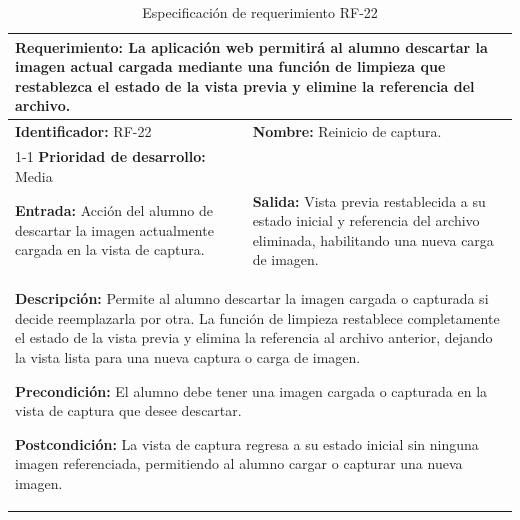 \begin{table}[H]
\caption{Especificación de requerimiento RF-22}
\centering
\renewcommand{\arraystretch}{1.3}
\setlength{\tabcolsep}{6pt}
\begin{tabular}{|p{7cm}|p{8cm}|}
\hline
\multicolumn{2}{|p{15cm}|}{\textbf{Requerimiento:} La aplicación web permitirá al alumno descartar la imagen actual cargada mediante una función de limpieza que restablezca el estado de la vista previa y elimine la referencia del archivo.} \\ \hline
\textbf{Identificador:} RF-22 &
\textbf{Nombre:} Reinicio de captura. \\ \cline{1-1}
\textbf{Prioridad de desarrollo:} Media &
\multicolumn{1}{p{8cm}|}{} \\ \hline
\textbf{Entrada:} Acción del alumno de descartar la imagen actualmente cargada en la vista de captura. &
\textbf{Salida:} Vista previa restablecida a su estado inicial y referencia del archivo eliminada, habilitando una nueva carga de imagen. \\ \hline
\multicolumn{2}{|p{15cm}|}{
\textbf{Descripción:} Permite al alumno descartar la imagen cargada o capturada si decide reemplazarla por otra. La función de limpieza restablece completamente el estado de la vista previa y elimina la referencia al archivo anterior, dejando la vista lista para una nueva captura o carga de imagen.

\vspace{0.2cm}
\textbf{Precondición:} El alumno debe tener una imagen cargada o capturada en la vista de captura que desee descartar.

\vspace{0.2cm}
\textbf{Postcondición:} La vista de captura regresa a su estado inicial sin ninguna imagen referenciada, permitiendo al alumno cargar o capturar una nueva imagen.
} \\ \hline
\end{tabular}
\label{tab:rf22}
\end{table}

